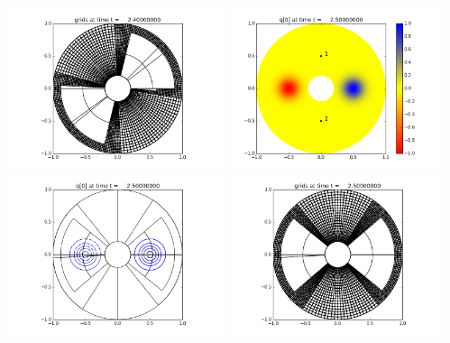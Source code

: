 \documentclass[11pt]{article}
\begin{document}
\vskip 10pt 
\includegraphics[width=0.475\textwidth]{frame0024fig2.png}
\vskip 10pt 
\includegraphics[width=0.475\textwidth]{frame0025fig0.png}
\includegraphics[width=0.475\textwidth]{frame0025fig1.png}
\vskip 10pt 
\includegraphics[width=0.475\textwidth]{frame0025fig2.png}
\end{document}
